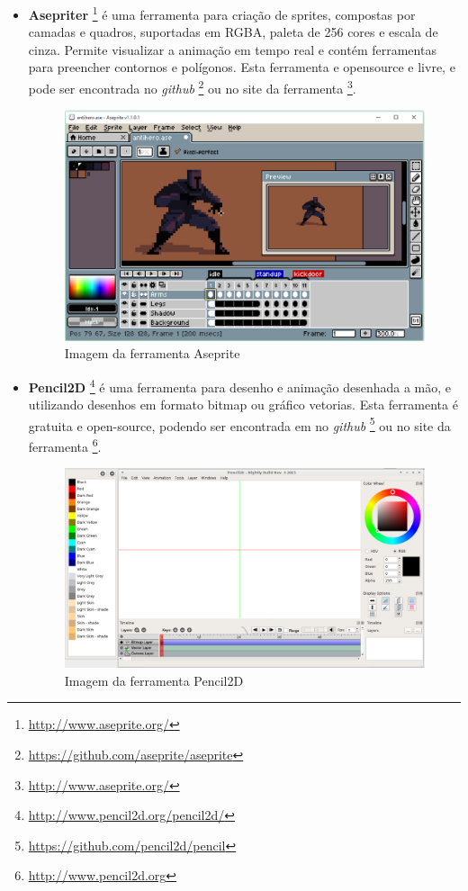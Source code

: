 \begin{itemize}
    \item \textbf{Asepriter}
\footnote{\url{http://www.aseprite.org/}} é uma ferramenta para criação de sprites,
 compostas por camadas e quadros, suportadas em RGBA, paleta de 256 cores e escala de cinza.
 Permite visualizar a animação em tempo real e contém ferramentas para preencher contornos
 e polígonos. Esta ferramenta e opensource e livre, e pode ser encontrada no \textit{github}
\footnote{\url{https://github.com/aseprite/aseprite}} ou no site da ferramenta
\footnote{\url{http://www.aseprite.org/}}.

    \begin{figure}[h]
        \centering
            \includegraphics[scale=0.3]{figuras/aseprite.eps}
        \caption{Imagem da ferramenta Aseprite}
        \label{ferramenta_aseprite}
    \end{figure}

    \item \textbf{Pencil2D}
\footnote{\url{http://www.pencil2d.org/pencil2d/}} é uma ferramenta para
 desenho e animação desenhada a mão, e utilizando desenhos em formato bitmap ou gráfico vetorias. 
Esta ferramenta é gratuita  e open-source, podendo ser encontrada em no \textit{github}
\footnote{\url{https://github.com/pencil2d/pencil}} ou no site da ferramenta
\footnote{\url{http://www.pencil2d.org}}.

    \begin{figure}[h]
        \centering
            \includegraphics[scale=0.3]{figuras/pencil2D.eps}
        \caption{Imagem da ferramenta Pencil2D}
        \label{ferramenta_pencil2D}
    \end{figure}


\end{itemize}
